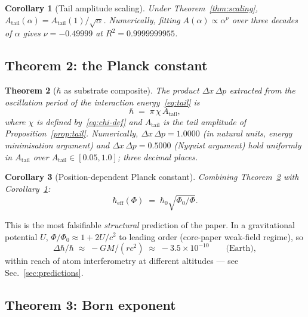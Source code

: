 \documentclass[11pt,a4paper]{article}
\renewcommand{\Phi}{\varPhi}
\newcommand{\PhiZero}{\varPhi_{0}}
\newcommand{\Atail}{A_{\mathrm{tail}}}
\newcommand{\chiTGP}{\chi}
\newcommand{\hbareff}{\hbar_{\mathrm{eff}}}
\newcommand{\hbarzero}{\hbar_{0}}
\newtheorem{theorem}{Theorem}
\newtheorem{corollary}[theorem]{Corollary}
\begin{document}
\begin{corollary}[Tail amplitude scaling]\label{cor:A-scaling}
Under Theorem~\ref{thm:scaling},
$\Atail(\alpha)=\Atail(1)/\sqrt{\alpha}$.
Numerically, fitting $A(\alpha)\propto\alpha^{\nu}$ over three decades
of $\alpha$ gives $\nu=-0.49999$ at $R^{2}=0.9999999955$.
\end{corollary}

\subsection{Theorem 2: the Planck constant}

\begin{theorem}[$\hbar$ as substrate composite]\label{thm:hbar}
The product $\Delta x\,\Delta p$ extracted from the oscillation period
of the interaction energy~\eqref{eq:tail} is
\begin{equation}\label{eq:hbar-def}
  \hbar \;=\; \pi\,\chiTGP\,\Atail,
\end{equation}
where $\chiTGP$ is defined by~\eqref{eq:chi-def} and $\Atail$ is the
tail amplitude of Proposition~\ref{prop:tail}.
Numerically, $\Delta x\,\Delta p=1.0000$ (in natural units, energy
minimisation argument) and $\Delta x\,\Delta p=0.5000$ (Nyquist
argument) hold \emph{uniformly} in $\Atail$ over
$\Atail\in[0.05,1.0]$; three decimal places.
\end{theorem}

\begin{corollary}[Position-dependent Planck constant]\label{cor:hbar-of-phi}
Combining Theorem~\ref{thm:hbar} with Corollary~\ref{cor:A-scaling}:
\begin{equation}\label{eq:hbar-of-phi}
  \boxed{\;\hbareff(\Phi) \;=\; \hbarzero\sqrt{\PhiZero/\Phi}.\;}
\end{equation}
\end{corollary}

This is the most falsifiable \emph{structural} prediction of the
paper. In a gravitational potential $U$, $\Phi/\PhiZero\approx 1+2U/c^{2}$
to leading order (core-paper weak-field regime), so
\begin{equation}\label{eq:hbar-altitude}
  \Delta\hbar/\hbar \;\approx\; -GM/(rc^{2}) \;\approx\; -3.5\times 10^{-10}
  \qquad \text{(Earth)},
\end{equation}
within reach of atom interferometry at different altitudes --- see
Sec.~\ref{sec:predictions}.

\subsection{Theorem 3: Born exponent}
\end{document}
